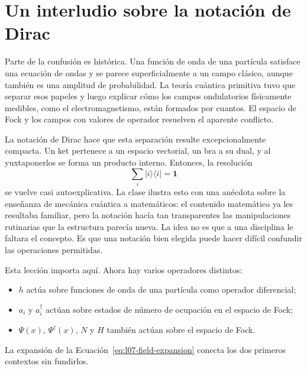 \section{Un interludio sobre la notación de Dirac}

Parte de la confusión es histórica. Una función de onda de una partícula satisface una ecuación de ondas y se parece superficialmente a un campo clásico, aunque también es una amplitud de probabilidad. La teoría cuántica primitiva tuvo que separar esos papeles y luego explicar cómo los campos ondulatorios físicamente medibles, como el electromagnetismo, están formados por cuantos. El espacio de Fock y los campos con valores de operador resuelven el aparente conflicto.

La notación de Dirac hace que esta separación resulte excepcionalmente compacta. Un ket pertenece a un espacio vectorial, un bra a su dual, y al yuxtaponerlos se forma un producto interno. Entonces, la resolución
\begin{equation}
\sum_i|i\rangle\langle i|=\mathbf 1
\end{equation}
se vuelve casi autoexplicativa. La clase ilustra esto con una anécdota sobre la enseñanza de mecánica cuántica a matemáticos: el contenido matemático ya les resultaba familiar, pero la notación hacía tan transparentes las manipulaciones rutinarias que la estructura parecía nueva. La idea no es que a una disciplina le faltara el concepto. Es que una notación bien elegida puede hacer difícil confundir las operaciones permitidas.

Esta lección importa aquí. Ahora hay varios operadores distintos:
\begin{itemize}
\item \(h\) actúa sobre funciones de onda de una partícula como operador diferencial;
\item \(a_i\) y \(a_i^\dagger\) actúan sobre estados de número de ocupación en el espacio de Fock;
\item \(\Psi(x)\), \(\Psi^\dagger(x)\), \(N\) y \(H\) también actúan sobre el espacio de Fock.
\end{itemize}
La expansión de la Ecuación~\eqref{eq:l07-field-expansion} conecta los dos primeros contextos sin fundirlos.

\begin{classroomqa}
\end{classroomqa}

